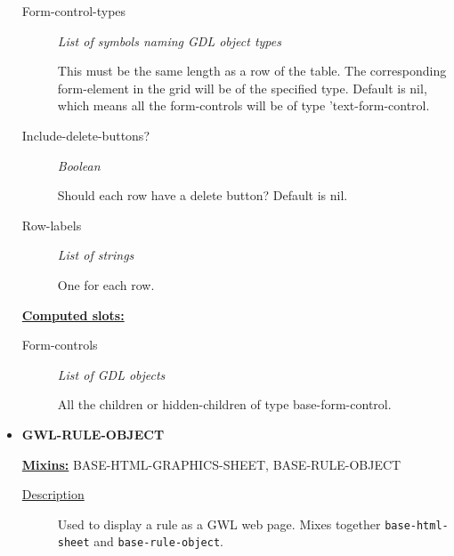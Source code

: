 \documentclass [11pt]{book}
\begin{document}
\begin{itemize}
\begin{description}
\item [Form-control-types]
\emph{List of symbols naming GDL object types}

 This must be
the same length as a row of the table. The corresponding
form-element in the grid will be of the specified type.
Default is nil, which means all the form-controls will
be of type 'text-form-control.




\item [Include-delete-buttons?]
\emph{Boolean}

 Should each row have a delete button?
Default is nil.




\item [Row-labels]
\emph{List of strings}

 One for each row.




\end{description}






\textbf{
\underline{Computed slots:}}

\begin{description}

\item [Form-controls]
\emph{List of GDL objects}

 All the children or hidden-children
of type base-form-control.




\end{description}







\item {}
\textbf{GWL-RULE-OBJECT}


\textbf{
\underline{Mixins:}} BASE-HTML-GRAPHICS-SHEET, BASE-RULE-OBJECT





\begin{description}

\item [
\underline{Description}]


Used to display a rule as a GWL web page. 
Mixes together \texttt{base-html-sheet} and \texttt{base-rule-object}.




\end{description}
\end{itemize}
\end{document}
